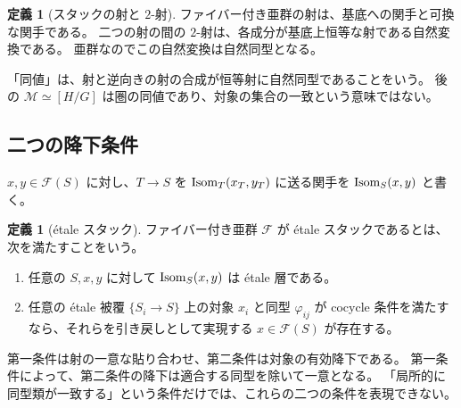 \documentclass[dvipdfmx,a4paper,11pt]{article}
\theoremstyle{definition}
\newtheorem{dfn}[thm]{定義}
\begin{document}
\begin{dfn}[スタックの射と $2$-射]
ファイバー付き亜群の射は、基底への関手と可換な関手である。
二つの射の間の $2$-射は、各成分が基底上恒等な射である自然変換である。
亜群なのでこの自然変換は自然同型となる。
\end{dfn}
「同値」は、射と逆向きの射の合成が恒等射に自然同型であることをいう。
後の $\mathcal M\simeq[H/G]$ は圏の同値であり、対象の集合の一致という意味ではない。

\subsection{二つの降下条件}
$x,y\in\mathcal F(S)$ に対し、$T\to S$ を
$\operatorname{Isom}_T(x_T,y_T)$ に送る関手を $\operatorname{Isom}_S(x,y)$ と書く。
\begin{dfn}[étale スタック]\label{def:stack}
ファイバー付き亜群 $\mathcal F$ が étale スタックであるとは、次を満たすことをいう。
\begin{enumerate}
\item 任意の $S,x,y$ に対して $\operatorname{Isom}_S(x,y)$ は étale 層である。
\item 任意の étale 被覆 $\{S_i\to S\}$ 上の対象 $x_i$ と同型 $\varphi_{ij}$ が cocycle 条件を満たすなら、それらを引き戻しとして実現する $x\in\mathcal F(S)$ が存在する。
\end{enumerate}
\end{dfn}
第一条件は射の一意な貼り合わせ、第二条件は対象の有効降下である。
第一条件によって、第二条件の降下は適合する同型を除いて一意となる。
「局所的に同型類が一致する」という条件だけでは、これらの二つの条件を表現できない。
\end{document}

